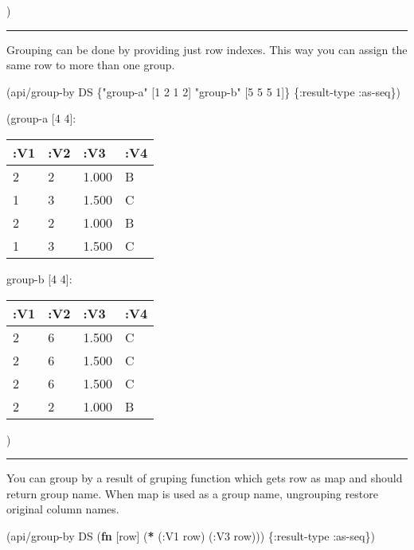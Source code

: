 \documentclass[]{article}
\newenvironment{Shaded}{\begin{snugshade}}{\end{snugshade}}
\newcommand{\KeywordTok}[1]{\textcolor[rgb]{0.13,0.29,0.53}{\textbf{#1}}}
\newcommand{\DecValTok}[1]{\textcolor[rgb]{0.00,0.00,0.81}{#1}}
\newcommand{\StringTok}[1]{\textcolor[rgb]{0.31,0.60,0.02}{#1}}
\newcommand{\AttributeTok}[1]{\textcolor[rgb]{0.77,0.63,0.00}{#1}}
\newcommand{\NormalTok}[1]{#1}
\begin{document}
)

\begin{center}\rule{0.5\linewidth}{0.5pt}\end{center}

Grouping can be done by providing just row indexes. This way you can
assign the same row to more than one group.

\begin{Shaded}
\begin{Highlighting}[]
\NormalTok{(api/group-by DS \{}\StringTok{"group-a"}\NormalTok{ [}\DecValTok{1} \DecValTok{2} \DecValTok{1} \DecValTok{2}\NormalTok{]}
                  \StringTok{"group-b"}\NormalTok{ [}\DecValTok{5} \DecValTok{5} \DecValTok{5} \DecValTok{1}\NormalTok{]\} \{}\AttributeTok{:result-type} \AttributeTok{:as-seq}\NormalTok{\})}
\end{Highlighting}
\end{Shaded}

(group-a {[}4 4{]}:

\begin{longtable}[]{@{}llll@{}}
\toprule
:V1 & :V2 & :V3 & :V4\tabularnewline
\midrule
\endhead
2 & 2 & 1.000 & B\tabularnewline
1 & 3 & 1.500 & C\tabularnewline
2 & 2 & 1.000 & B\tabularnewline
1 & 3 & 1.500 & C\tabularnewline
\bottomrule
\end{longtable}

group-b {[}4 4{]}:

\begin{longtable}[]{@{}llll@{}}
\toprule
:V1 & :V2 & :V3 & :V4\tabularnewline
\midrule
\endhead
2 & 6 & 1.500 & C\tabularnewline
2 & 6 & 1.500 & C\tabularnewline
2 & 6 & 1.500 & C\tabularnewline
2 & 2 & 1.000 & B\tabularnewline
\bottomrule
\end{longtable}

)

\begin{center}\rule{0.5\linewidth}{0.5pt}\end{center}

You can group by a result of gruping function which gets row as map and
should return group name. When map is used as a group name, ungrouping
restore original column names.

\begin{Shaded}
\begin{Highlighting}[]
\NormalTok{(api/group-by DS (}\KeywordTok{fn}\NormalTok{ [row] (}\KeywordTok{*}\NormalTok{ (}\AttributeTok{:V1}\NormalTok{ row)}
\NormalTok{                             (}\AttributeTok{:V3}\NormalTok{ row))) \{}\AttributeTok{:result-type} \AttributeTok{:as-seq}\NormalTok{\})}
\end{Highlighting}
\end{Shaded}
\end{document}
